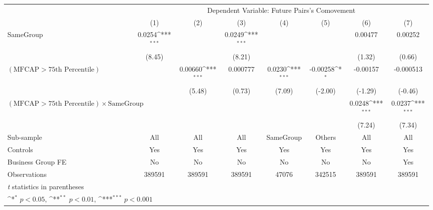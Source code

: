 {
\def\sym#1{\ifmmode^{#1}\else\(^{#1}\)\fi}
\begin{tabular}{l*{7}{c}}
\hline\hline
                &\multicolumn{7}{c}{Dependent Variable:  Future Pairs's Comovement}                                                                  \\\cmidrule(lr){2-8}
                &\multicolumn{1}{c}{(1)}         &\multicolumn{1}{c}{(2)}         &\multicolumn{1}{c}{(3)}         &\multicolumn{1}{c}{(4)}         &\multicolumn{1}{c}{(5)}         &\multicolumn{1}{c}{(6)}         &\multicolumn{1}{c}{(7)}         \\
\hline
SameGroup       &   0.0254\sym{***}&                  &   0.0249\sym{***}&                  &                  &  0.00477         &  0.00252         \\
                &   (8.45)         &                  &   (8.21)         &                  &                  &   (1.32)         &   (0.66)         \\
[1em]
$ (\text{MFCAP} > \text{75th Percentile}) $ &                  &  0.00660\sym{***}& 0.000777         &   0.0230\sym{***}& -0.00258\sym{*}  & -0.00157         &-0.000513         \\
                &                  &   (5.48)         &   (0.73)         &   (7.09)         &  (-2.00)         &  (-1.29)         &  (-0.46)         \\
[1em]
 $ (\text{MFCAP} > \text{75th Percentile}) \times {\text{SameGroup}} $ &                  &                  &                  &                  &                  &   0.0248\sym{***}&   0.0237\sym{***}\\
                &                  &                  &                  &                  &                  &   (7.24)         &   (7.34)         \\
\hline
Sub-sample      &      All         &      All         &      All         &SameGroup         &   Others         &      All         &      All         \\
Controls        &      Yes         &      Yes         &      Yes         &      Yes         &      Yes         &      Yes         &      Yes         \\
Business Group FE&       No         &       No         &       No         &       No         &       No         &       No         &      Yes         \\
Observations    &   389591         &   389591         &   389591         &    47076         &   342515         &   389591         &   389591         \\
\hline\hline
\multicolumn{8}{l}{\footnotesize \textit{t} statistics in parentheses}\\
\multicolumn{8}{l}{\footnotesize \sym{*} \(p<0.05\), \sym{**} \(p<0.01\), \sym{***} \(p<0.001\)}\\
\end{tabular}
}
